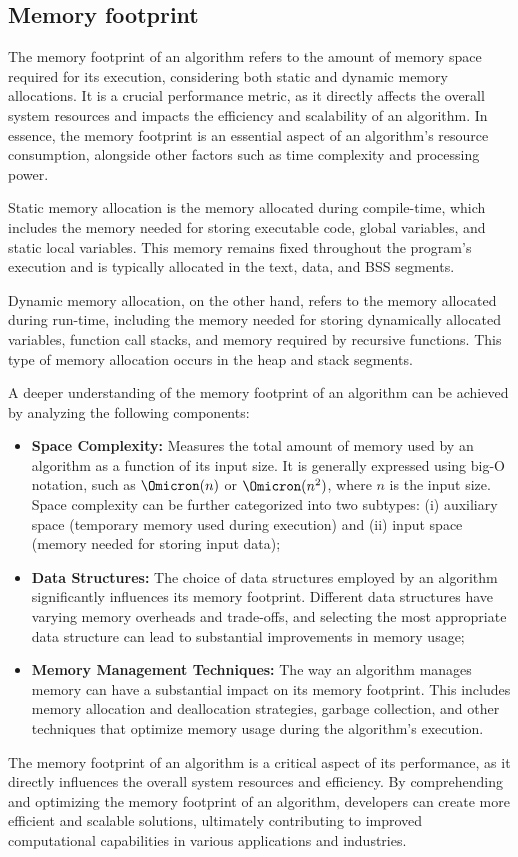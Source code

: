 \subsection{Memory footprint}
\label{subsec:memory-footprint}

The memory footprint of an algorithm refers to the amount of memory space required for its execution, considering both static and dynamic memory allocations.
It is a crucial performance metric, as it directly affects the overall system resources and impacts the efficiency and scalability of an algorithm.
In essence, the memory footprint is an essential aspect of an algorithm's resource consumption, alongside other factors such as time complexity and processing power.

Static memory allocation is the memory allocated during compile-time, which includes the memory needed for storing executable code, global variables, and static local variables.
This memory remains fixed throughout the program's execution and is typically allocated in the text, data, and \ac{BSS} segments.

Dynamic memory allocation, on the other hand, refers to the memory allocated during run-time, including the memory needed for storing dynamically allocated variables, function call stacks, and memory required by recursive functions.
This type of memory allocation occurs in the heap and stack segments.

A deeper understanding of the memory footprint of an algorithm can be achieved by analyzing the following components:

\begin{itemize}
    \item \textbf{Space Complexity:} Measures the total amount of memory used by an algorithm as a function of its input size.
        It is generally expressed using big-O notation, such as $\Omicron(n)$ or $\Omicron(n^2)$, where $n$ is the input size.
        Space complexity can be further categorized into two subtypes:
        (i) auxiliary space (temporary memory used during execution) and
        (ii) input space (memory needed for storing input data);
    \item \textbf{Data Structures:} The choice of data structures employed by an algorithm significantly influences its memory footprint.
        Different data structures have varying memory overheads and trade-offs, and selecting the most appropriate data structure can lead to substantial improvements in memory usage;
    \item \textbf{Memory Management Techniques:} The way an algorithm manages memory can have a substantial impact on its memory footprint.
        This includes memory allocation and deallocation strategies, garbage collection, and other techniques that optimize memory usage during the algorithm's execution.
\end{itemize}

The memory footprint of an algorithm is a critical aspect of its performance, as it directly influences the overall system resources and efficiency.
By comprehending and optimizing the memory footprint of an algorithm, developers can create more efficient and scalable solutions, ultimately contributing to improved computational capabilities in various applications and industries.
